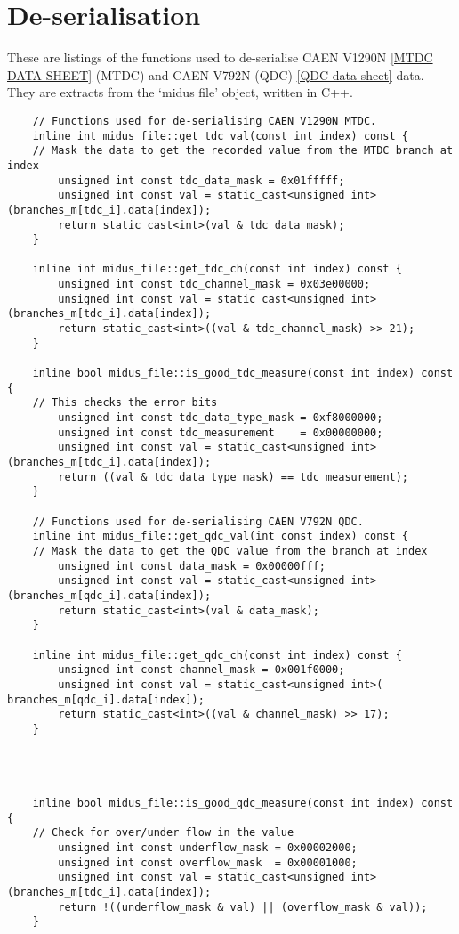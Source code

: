 \documentclass[]{article}
\begin{document}
\section{De-serialisation} %
\label{app:deserialisation}
%
These are listings of the functions used to de-serialise CAEN V1290N \ref{MTDC DATA SHEET} (MTDC) and CAEN V792N (QDC) \ref{QDC data sheet} data. They are extracts from the `midus file' object, written in C++.
%
\begin{verbatim}
    // Functions used for de-serialising CAEN V1290N MTDC.
    inline int midus_file::get_tdc_val(const int index) const {
    // Mask the data to get the recorded value from the MTDC branch at index
        unsigned int const tdc_data_mask = 0x01fffff;
        unsigned int const val = static_cast<unsigned int>(branches_m[tdc_i].data[index]);
        return static_cast<int>(val & tdc_data_mask);
    }
    
    inline int midus_file::get_tdc_ch(const int index) const {
        unsigned int const tdc_channel_mask = 0x03e00000;
        unsigned int const val = static_cast<unsigned int>(branches_m[tdc_i].data[index]);
        return static_cast<int>((val & tdc_channel_mask) >> 21);
    }
    
    inline bool midus_file::is_good_tdc_measure(const int index) const {
    // This checks the error bits
        unsigned int const tdc_data_type_mask = 0xf8000000;
        unsigned int const tdc_measurement    = 0x00000000;
        unsigned int const val = static_cast<unsigned int>(branches_m[tdc_i].data[index]);
        return ((val & tdc_data_type_mask) == tdc_measurement);
    }
    
    // Functions used for de-serialising CAEN V792N QDC.
    inline int midus_file::get_qdc_val(int const index) const {
    // Mask the data to get the QDC value from the branch at index
        unsigned int const data_mask = 0x00000fff;
        unsigned int const val = static_cast<unsigned int>(branches_m[qdc_i].data[index]);
        return static_cast<int>(val & data_mask); 
    }
    
    inline int midus_file::get_qdc_ch(const int index) const {
        unsigned int const channel_mask = 0x001f0000;
        unsigned int const val = static_cast<unsigned int>( branches_m[qdc_i].data[index]);
        return static_cast<int>((val & channel_mask) >> 17);
    }
    
    
    
    
    inline bool midus_file::is_good_qdc_measure(const int index) const {
    // Check for over/under flow in the value
        unsigned int const underflow_mask = 0x00002000;
        unsigned int const overflow_mask  = 0x00001000;
        unsigned int const val = static_cast<unsigned int>(branches_m[tdc_i].data[index]);
        return !((underflow_mask & val) || (overflow_mask & val));
    }
\end{verbatim}
\end{document}
